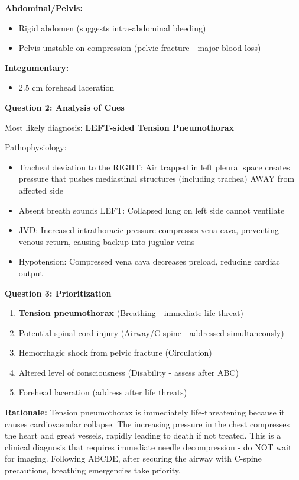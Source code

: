 \documentclass[11pt]{article}
\begin{document}
\textbf{Abdominal/Pelvis:}
\begin{itemize}
    \item Rigid abdomen (suggests intra-abdominal bleeding)
    \item Pelvis unstable on compression (pelvic fracture - major blood loss)
\end{itemize}

\textbf{Integumentary:}
\begin{itemize}
    \item 2.5 cm forehead laceration
\end{itemize}

\vspace{0.5cm}
\textbf{Question 2: Analysis of Cues}

Most likely diagnosis: \textbf{LEFT-sided Tension Pneumothorax}

Pathophysiology:
\begin{itemize}
    \item Tracheal deviation to the RIGHT: Air trapped in left pleural space creates pressure that pushes mediastinal structures (including trachea) AWAY from affected side
    \item Absent breath sounds LEFT: Collapsed lung on left side cannot ventilate
    \item JVD: Increased intrathoracic pressure compresses vena cava, preventing venous return, causing backup into jugular veins
    \item Hypotension: Compressed vena cava decreases preload, reducing cardiac output
\end{itemize}

\vspace{0.5cm}
\textbf{Question 3: Prioritization}

\begin{enumerate}
    \item \textbf{Tension pneumothorax} (Breathing - immediate life threat)
    \item Potential spinal cord injury (Airway/C-spine - addressed simultaneously)
    \item Hemorrhagic shock from pelvic fracture (Circulation)
    \item Altered level of consciousness (Disability - assess after ABC)
    \item Forehead laceration (address after life threats)
\end{enumerate}

\textbf{Rationale:} Tension pneumothorax is immediately life-threatening because it causes cardiovascular collapse. The increasing pressure in the chest compresses the heart and great vessels, rapidly leading to death if not treated. This is a clinical diagnosis that requires immediate needle decompression - do NOT wait for imaging. Following ABCDE, after securing the airway with C-spine precautions, breathing emergencies take priority.
\end{document}
